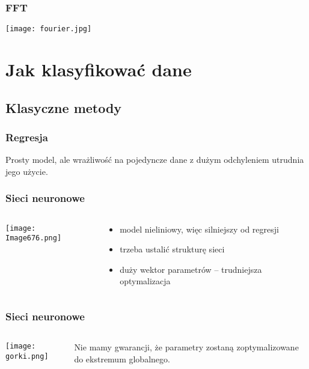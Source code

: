 \documentclass{beamer}
\begin{document}
\begin{frame} \frametitle{FFT}
\texttt{[image: fourier.jpg]}
\end{frame}

\section{Jak klasyfikować dane}
\subsection{Klasyczne metody}
\begin{frame} \frametitle{Regresja}
Prosty model, ale wrażliwość na pojedyncze dane z dużym odchyleniem utrudnia jego użycie.
\end{frame}

\begin{frame} \frametitle{Sieci neuronowe}
\begin{columns}
\begin{column}{5cm}
 \texttt{[image: Image676.png]}
\end{column}

 \begin{column}{5cm}
\begin{itemize}
 \item model nieliniowy, więc silniejszy od regresji
 \pause \item trzeba ustalić strukturę sieci
 \pause \item duży wektor parametrów -- trudniejsza optymalizacja 
\end{itemize}  
 \end{column}

\end{columns}


\end{frame}

\begin{frame} \frametitle{Sieci neuronowe}
\begin{columns}
\begin{column}{5cm}
\texttt{[image: gorki.png]}
\end{column}
\begin{column}{5cm}
Nie mamy gwarancji, że parametry zostaną zoptymalizowane do ekstremum globalnego.
\end{column}
\end{columns}
\end{frame}
\end{document}
